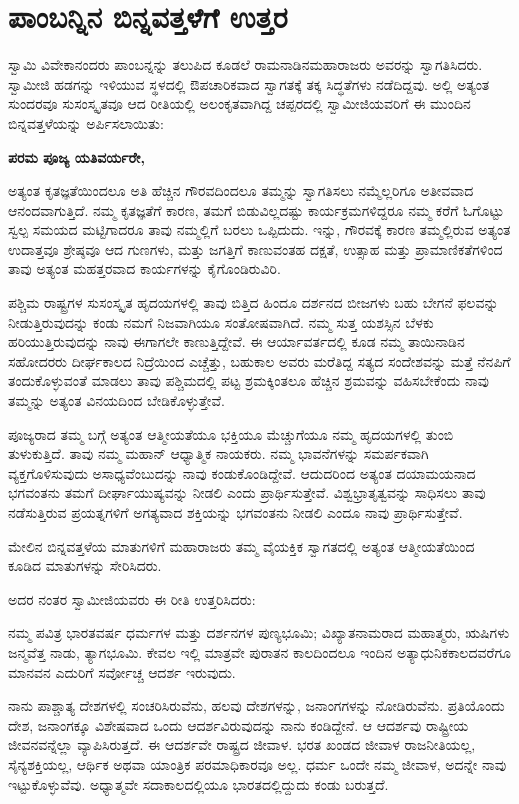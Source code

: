 
\chapter{ಪಾಂಬನ್ನಿನ ಬಿನ್ನವತ್ತಳೆಗೆ ಉತ್ತರ}

ಸ್ವಾಮಿ ವಿವೇಕಾನಂದರು ಪಾಂಬನ್ನನ್ನು ತಲುಪಿದ ಕೂಡಲೆ ರಾಮನಾಡಿನ\break ಮಹಾರಾಜರು ಅವರನ್ನು ಸ್ವಾಗತಿಸಿದರು. ಸ್ವಾಮೀಜಿ ಹಡಗನ್ನು ಇಳಿಯುವ ಸ್ಥಳದಲ್ಲಿ ಔಪಚಾರಿಕವಾದ ಸ್ವಾಗತಕ್ಕೆ ತಕ್ಕ ಸಿದ್ಧತೆಗಳು ನಡೆದಿದ್ದವು. ಅಲ್ಲಿ ಅತ್ಯಂತ ಸುಂದರವೂ ಸುಸಂಸ್ಕೃತವೂ ಆದ ರೀತಿಯಲ್ಲಿ ಅಲಂಕೃತವಾಗಿದ್ದ ಚಪ್ಪರದಲ್ಲಿ ಸ್ವಾಮೀಜಿಯವರಿಗೆ ಈ ಮುಂದಿನ ಬಿನ್ನವತ್ತಳೆಯನ್ನು ಅರ್ಪಿಸಲಾಯಿತು:

\textbf{ಪರಮ ಪೂಜ್ಯ ಯತಿವರ್ಯರೇ,}

ಅತ್ಯಂತ ಕೃತಜ್ಞತೆಯಿಂದಲೂ ಅತಿ ಹೆಚ್ಚಿನ ಗೌರವದಿಂದಲೂ ತಮ್ಮನ್ನು ಸ್ವಾಗತಿಸಲು ನಮ್ಮೆಲ್ಲರಿಗೂ ಅತೀವವಾದ ಆನಂದವಾಗುತ್ತಿದೆ. ನಮ್ಮ ಕೃತಜ್ಞತೆಗೆ ಕಾರಣ, ತಮಗೆ ಬಿಡುವಿಲ್ಲದಷ್ಟು ಕಾರ್ಯಕ್ರಮಗಳಿದ್ದರೂ ನಮ್ಮ ಕರೆಗೆ ಓಗೊಟ್ಟು ಸ್ವಲ್ಪ ಸಮಯದ ಮಟ್ಟಿಗಾದರೂ ತಾವು ನಮ್ಮಲ್ಲಿಗೆ ಬರಲು ಒಪ್ಪಿದುದು. ಇನ್ನು, ಗೌರವಕ್ಕೆ ಕಾರಣ ತಮ್ಮಲ್ಲಿರುವ ಅತ್ಯಂತ ಉದಾತ್ತವೂ ಶ್ರೇಷ್ಠವೂ ಆದ ಗುಣಗಳು, ಮತ್ತು ಜಗತ್ತಿಗೆ ಕಾಣುವಂತಹ ದಕ್ಷತೆ, ಉತ್ಸಾಹ ಮತ್ತು ಪ್ರಾಮಾಣಿಕತೆಗಳಿಂದ ತಾವು ಅತ್ಯಂತ ಮಹತ್ತರವಾದ ಕಾರ್ಯಗಳನ್ನು ಕೈಗೊಂಡಿರುವಿರಿ.

ಪಶ್ಚಿಮ ರಾಷ್ಟ್ರಗಳ ಸುಸಂಸ್ಕೃತ ಹೃದಯಗಳಲ್ಲಿ ತಾವು ಬಿತ್ತಿದ ಹಿಂದೂ ದರ್ಶನದ ಬೀಜಗಳು ಬಹು ಬೇಗನೆ ಫಲವನ್ನು ನೀಡುತ್ತಿರುವುದನ್ನು ಕಂಡು ನಮಗೆ ನಿಜವಾಗಿಯೂ ಸಂತೋಷವಾಗಿದೆ. ನಮ್ಮ ಸುತ್ತ ಯಶಸ್ಸಿನ ಬೆಳಕು ಹರಿಯುತ್ತಿರುವುದನ್ನು ನಾವು ಈಗಾಗಲೇ ಕಾಣುತ್ತಿದ್ದೇವೆ. ಈ ಆರ್ಯಾವರ್ತದಲ್ಲಿ ಕೂಡ ನಮ್ಮ ತಾಯಿನಾಡಿನ ಸಹೋದರರು ದೀರ್ಘಕಾಲದ ನಿದ್ರೆಯಿಂದ ಎಚ್ಚೆತ್ತು, ಬಹುಕಾಲ ಅವರು ಮರೆತಿದ್ದ ಸತ್ಯದ ಸಂದೇಶವನ್ನು ಮತ್ತೆ ನೆನಪಿಗೆ ತಂದುಕೊಳ್ಳುವಂತೆ ಮಾಡಲು ತಾವು ಪಶ್ಚಿಮದಲ್ಲಿ ಪಟ್ಟ ಶ್ರಮಕ್ಕಿಂತಲೂ ಹೆಚ್ಚಿನ ಶ್ರಮವನ್ನು ವಹಿಸಬೇಕೆಂದು ನಾವು ತಮ್ಮನ್ನು ಅತ್ಯಂತ ವಿನಯದಿಂದ ಬೇಡಿಕೊಳ್ಳುತ್ತೇವೆ.

ಪೂಜ್ಯರಾದ ತಮ್ಮ ಬಗ್ಗೆ ಅತ್ಯಂತ ಆತ್ಮೀಯತೆಯೂ ಭಕ್ತಿಯೂ ಮೆಚ್ಚುಗೆಯೂ ನಮ್ಮ ಹೃದಯಗಳಲ್ಲಿ ತುಂಬಿ ತುಳುಕುತ್ತಿದೆ. ತಾವು ನಮ್ಮ ಮಹಾನ್​ ಆಧ್ಯಾತ್ಮಿಕ ನಾಯಕರು. ನಮ್ಮ ಭಾವನೆಗಳನ್ನು ಸಮರ್ಪಕವಾಗಿ ವ್ಯಕ್ತಗೊಳಿಸುವುದು ಅಸಾಧ್ಯವೆಂಬುದನ್ನು ನಾವು ಕಂಡುಕೊಂಡಿದ್ದೇವೆ. ಆದುದರಿಂದ ಅತ್ಯಂತ ದಯಾಮಯನಾದ ಭಗವಂತನು ತಮಗೆ ದೀರ್ಘಾಯುಷ್ಯವನ್ನು ನೀಡಲಿ ಎಂದು ಪ್ರಾರ್ಥಿಸುತ್ತೇವೆ. ವಿಶ್ವಭ್ರಾತೃತ್ವವನ್ನು ಸಾಧಿಸಲು ತಾವು ನಡೆಸುತ್ತಿರುವ ಪ್ರಯತ್ನಗಳಿಗೆ ಅಗತ್ಯವಾದ ಶಕ್ತಿಯನ್ನು ಭಗವಂತನು ನೀಡಲಿ ಎಂದೂ ನಾವು ಪ್ರಾರ್ಥಿಸುತ್ತೇವೆ.

ಮೇಲಿನ ಬಿನ್ನವತ್ತಳೆಯ ಮಾತುಗಳಿಗೆ ಮಹಾರಾಜರು ತಮ್ಮ ವೈಯಕ್ತಿಕ ಸ್ವಾಗತದಲ್ಲಿ ಅತ್ಯಂತ ಆತ್ಮೀಯತೆಯಿಂದ ಕೂಡಿದ ಮಾತುಗಳನ್ನು ಸೇರಿಸಿದರು.

ಅದರ ನಂತರ ಸ್ವಾಮೀಜಿಯವರು ಈ ರೀತಿ ಉತ್ತರಿಸಿದರು:

ನಮ್ಮ ಪವಿತ್ರ ಭಾರತವರ್ಷ ಧರ್ಮಗಳ ಮತ್ತು ದರ್ಶನಗಳ ಪುಣ್ಯಭೂಮಿ; ವಿಖ್ಯಾತನಾಮರಾದ ಮಹಾತ್ಮರು, ಋಷಿಗಳು ಜನ್ಮವೆತ್ತ ನಾಡು, ತ್ಯಾಗಭೂಮಿ. ಕೇವಲ ಇಲ್ಲಿ ಮಾತ್ರವೇ ಪುರಾತನ ಕಾಲದಿಂದಲೂ ಇಂದಿನ ಅತ್ಯಾಧುನಿಕ\break ಕಾಲದವರೆಗೂ ಮಾನವನ ಎದುರಿಗೆ ಸರ್ವೋಚ್ಚ ಆದರ್ಶ ಇರುವುದು.

ನಾನು ಪಾಶ್ಚಾತ್ಯ ದೇಶಗಳಲ್ಲಿ ಸಂಚರಿಸಿರುವೆನು, ಹಲವು ದೇಶಗಳನ್ನು, ಜನಾಂಗಗಳನ್ನು ನೋಡಿರುವೆನು. ಪ್ರತಿಯೊಂದು ದೇಶ, ಜನಾಂಗಕ್ಕೂ ವಿಶೇಷವಾದ ಒಂದು ಆದರ್ಶವಿರುವುದನ್ನು ನಾನು ಕಂಡಿದ್ದೇನೆ. ಆ ಆದರ್ಶವು ರಾಷ್ಟ್ರೀಯ ಜೀವನವನ್ನೆಲ್ಲಾ ವ್ಯಾಪಿಸಿರುತ್ತದೆ. ಈ ಆದರ್ಶವೇ ರಾಷ್ಟ್ರದ ಜೀವಾಳ. ಭರತ ಖಂಡದ ಜೀವಾಳ ರಾಜನೀತಿಯಲ್ಲ, ಸೈನ್ಯಶಕ್ತಿಯಲ್ಲ, ಆರ್ಥಿಕ ಅಥವಾ ಯಾಂತ್ರಿಕ ಪರಮಾಧಿಕಾರವೂ ಅಲ್ಲ. ಧರ್ಮ ಒಂದೇ ನಮ್ಮ ಜೀವಾಳ, ಅದನ್ನೇ ನಾವು ಇಟ್ಟುಕೊಳ್ಳುವೆವು. ಅಧ್ಯಾತ್ಮವೇ ಸದಾಕಾಲದಲ್ಲಿಯೂ ಭಾರತದಲ್ಲಿದ್ದುದು ಕಂಡು ಬರುತ್ತದೆ.

